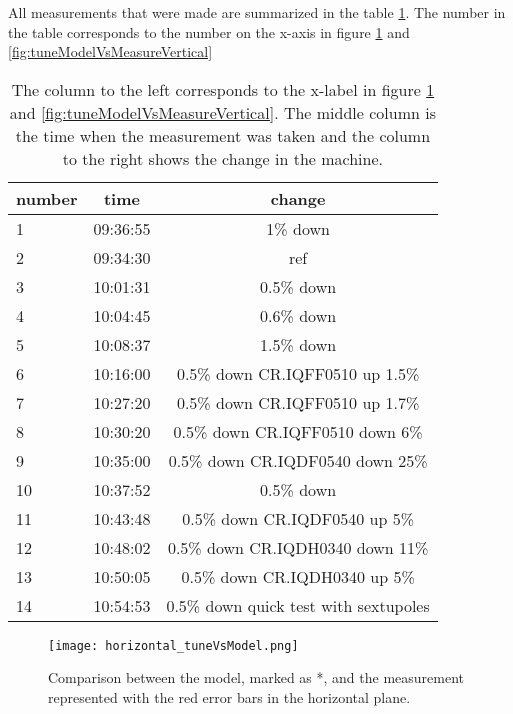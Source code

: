 All measurements that were made are summarized in the table \ref{tab:tuneMeasureTime}. The number in the table corresponds to the number on the x-axis in figure \ref{fig:tuneModelVsMeasureHorizontal} and \ref{fig:tuneModelVsMeasureVertical}
\begin{table}[ht]
\centering
\begin{tabular}{| l | c | c |}
\hline
\textbf{number} & \textbf{time} & \textbf{change} \\ \hline
1 & 09:36:55 & 1\% down \\
2 & 09:34:30 & ref \\
3 & 10:01:31 & 0.5\% down \\
4 & 10:04:45 & 0.6\% down   \\
5 & 10:08:37 & 1.5\% down  \\
6 & 10:16:00 & 0.5\% down  CR.IQFF0510 up 1.5\% \\
7 & 10:27:20 & 0.5\% down  CR.IQFF0510 up 1.7\% \\
8 & 10:30:20 & 0.5\% down  CR.IQFF0510 down 6\% \\
9 & 10:35:00  & 0.5\% down  CR.IQDF0540 down 25\% \\
10 & 10:37:52 &  0.5\% down \\
11 & 10:43:48 &  0.5\% down  CR.IQDF0540 up 5\% \\
12 & 10:48:02 &  0.5\% down  CR.IQDH0340 down 11\% \\
13 & 10:50:05 &  0.5\% down  CR.IQDH0340 up 5\% \\
14 & 10:54:53 &  0.5\% down  quick test with sextupoles \\
\hline
\end{tabular}
\caption[Time and numbering of the tune measurement.]{The column to the left corresponds to the x-label in figure \ref{fig:tuneModelVsMeasureHorizontal} and \ref{fig:tuneModelVsMeasureVertical}. The middle column is the time when the measurement was taken and the column to the right shows the change in the machine.  \label{tab:tuneMeasureTime}}
\end{table}
\begin{figure}[!h]
\centering
\texttt{[image: horizontal\_tuneVsModel.png]}
\caption[Comparison between the tune from the model and the measurement in the horizontal plane]{Comparison between the model, marked as *, and the measurement represented with the red error bars in the horizontal plane. \label{fig:tuneModelVsMeasureHorizontal}}
\end{figure}
 
